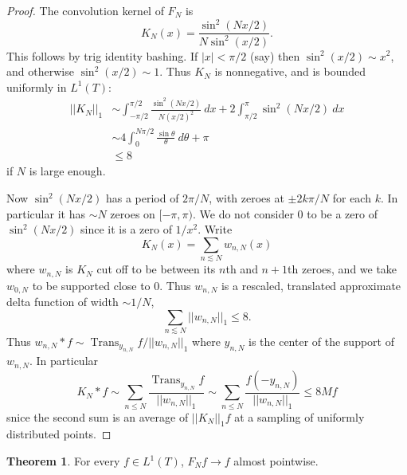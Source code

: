 \documentclass[12pt]{report}
\DeclareMathOperator*{\Trans}{Trans}
\theoremstyle{definition}
\newtheorem{theorem}{Theorem}[chapter]
\begin{document}
\begin{proof}
The convolution kernel of $F_N$ is
$$K_N(x) = \frac{\sin^2(Nx/2)}{N\sin^2(x/2)}.$$
This follows by trig identity bashing.
If $|x| < \pi/2$ (say) then $\sin^2(x/2) \sim x^2$, and otherwise $\sin^2(x/2) \sim 1$.
Thus $K_N$ is nonnegative, and is bounded uniformly in $L^1(T)$:
\begin{align*}||K_N||_1 &\sim \int_{-\pi/2}^{\pi/2} \frac{\sin^2(Nx/2)}{N(x/2)^2} ~dx + 2\int_{\pi/2}^\pi \sin^2(Nx/2)~dx \\
  &\sim 4\int_0^{N\pi/2} \frac{\sin \theta}{\theta}~d\theta + \pi \\
  &\leq 8
\end{align*}
if $N$ is large enough.

Now $\sin^2(Nx/2)$ has a period of $2\pi/N$, with zeroes at $\pm 2k\pi/N$ for each $k$. In particular it has $\sim N$ zeroes on $[-\pi, \pi)$.
We do not consider $0$ to be a zero of $\sin^2(Nx/2)$ since it is a zero of $1/x^2$.
Write
$$K_N(x) = \sum_{n \lesssim N} w_{n,N}(x)$$
where $w_{n,N}$ is $K_N$ cut off to be between its $n$th and $n+1$th zeroes, and we take $w_{0,N}$ to be supported close to $0$.
Thus $w_{n,N}$ is a rescaled, translated approximate delta function of width $\sim 1/N$,
$$\sum_{n \lesssim N} ||w_{n,N}||_1 \leq 8.$$
Thus $w_{n,N} * f \sim \Trans_{y_{n,N}} f/||w_{n,N}||_1$ where $y_{n,N}$ is the center of the support of $w_{n,N}$. In particular
$$K_N * f \sim \sum_{n \leq N} \frac{\Trans_{y_{n,N}}f}{||w_{n,N}||_1} \sim \sum_{n \leq N} \frac{f(-y_{n,N})}{||w_{n,N}||_1} \leq 8Mf$$
snice the second sum is an average of $||K_N||_1f$ at a sampling of uniformly distributed points.
\end{proof}
\begin{theorem}
For every $f \in L^1(T)$, $F_Nf \to f$ almost pointwise.
\end{theorem}
\end{document}
